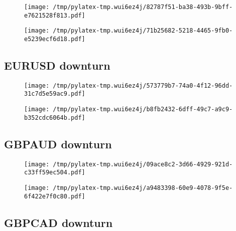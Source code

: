 \documentclass{article}%
\begin{document}
\begin{figure}[htbp]%
\centering%
\texttt{[image: /tmp/pylatex-tmp.wui6ez4j/82787f51-ba38-493b-9bff-e7621528f813.pdf]}%
\end{figure}

%


\begin{figure}[htbp]%
\centering%
\texttt{[image: /tmp/pylatex-tmp.wui6ez4j/71b25682-5218-4465-9fb0-e5239ecf6d18.pdf]}%
\end{figure}

%
\newpage %
\subsection{EURUSD downturn}%
\label{subsec:EURUSDdownturn}%


\begin{figure}[htbp]%
\centering%
\texttt{[image: /tmp/pylatex-tmp.wui6ez4j/573779b7-74a0-4f12-96dd-31c7d5e59ac9.pdf]}%
\end{figure}

%


\begin{figure}[htbp]%
\centering%
\texttt{[image: /tmp/pylatex-tmp.wui6ez4j/b8fb2432-6dff-49c7-a9c9-b352cdc6064b.pdf]}%
\end{figure}

%
\newpage %
\subsection{GBPAUD downturn}%
\label{subsec:GBPAUDdownturn}%


\begin{figure}[htbp]%
\centering%
\texttt{[image: /tmp/pylatex-tmp.wui6ez4j/09ace8c2-3d66-4929-921d-c33ff59ec504.pdf]}%
\end{figure}

%


\begin{figure}[htbp]%
\centering%
\texttt{[image: /tmp/pylatex-tmp.wui6ez4j/a9483398-60e9-4078-9f5e-6f422e7f0c80.pdf]}%
\end{figure}

%
\newpage %
\subsection{GBPCAD downturn}%
\label{subsec:GBPCADdownturn}%
\end{document}
